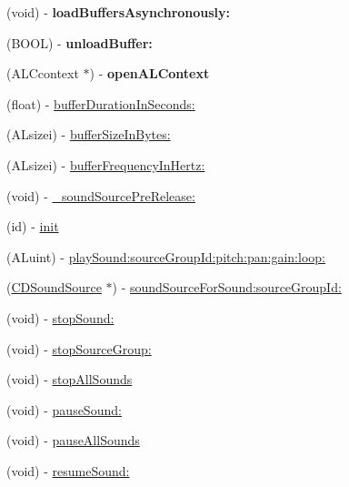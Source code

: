 \begin{DoxyCompactItemize}
(void) -\/ {\bfseries load\+Buffers\+Asynchronously\+:}
\item 
\mbox{\label{interfaceCDSoundEngine_a2a245d09bd9aa88de752c97dd889662e}} 
(B\+O\+OL) -\/ {\bfseries unload\+Buffer\+:}
\item 
\mbox{\label{interfaceCDSoundEngine_a3207754d8ae7d5a63dc03fd43b698d12}} 
(A\+L\+Ccontext $\ast$) -\/ {\bfseries open\+A\+L\+Context}
\item 
(float) -\/ \hyperlink{interfaceCDSoundEngine_a5731f4ec2052eb323ba1777f72c9da8c}{buffer\+Duration\+In\+Seconds\+:}
\item 
(A\+Lsizei) -\/ \hyperlink{interfaceCDSoundEngine_a91672bece24f10760d62cce27986573e}{buffer\+Size\+In\+Bytes\+:}
\item 
(A\+Lsizei) -\/ \hyperlink{interfaceCDSoundEngine_af8559b48f34ad22ba9a7cf27ffcb8648}{buffer\+Frequency\+In\+Hertz\+:}
\item 
(void) -\/ \hyperlink{interfaceCDSoundEngine_ad05b4a121e37fe36d3df453989be82af}{\+\_\+sound\+Source\+Pre\+Release\+:}
\item 
(id) -\/ \hyperlink{interfaceCDSoundEngine_a013cb9b6cf86c0dbfca8fac6aae0bd6a}{init}
\item 
(A\+Luint) -\/ \hyperlink{interfaceCDSoundEngine_a03aee643e250635e2594e5ced4fbe7b2}{play\+Sound\+:source\+Group\+Id\+:pitch\+:pan\+:gain\+:loop\+:}
\item 
(\hyperlink{interfaceCDSoundSource}{C\+D\+Sound\+Source} $\ast$) -\/ \hyperlink{interfaceCDSoundEngine_ab0c372cb85df05a4070b8f8bd2213efd}{sound\+Source\+For\+Sound\+:source\+Group\+Id\+:}
\item 
(void) -\/ \hyperlink{interfaceCDSoundEngine_ae2bbd23eefecd32afcf6bc0109b5e7a2}{stop\+Sound\+:}
\item 
(void) -\/ \hyperlink{interfaceCDSoundEngine_a5d6fbd530895fac2ce486a478e46fb23}{stop\+Source\+Group\+:}
\item 
(void) -\/ \hyperlink{interfaceCDSoundEngine_a8bbc63632a5e72c9235c39730e8efb38}{stop\+All\+Sounds}
\item 
(void) -\/ \hyperlink{interfaceCDSoundEngine_afd1f581938bf541447eaa9430712fff7}{pause\+Sound\+:}
\item 
(void) -\/ \hyperlink{interfaceCDSoundEngine_ac84ad4fe69381aa32b836f8a3a1b5e1f}{pause\+All\+Sounds}
\item 
(void) -\/ \hyperlink{interfaceCDSoundEngine_ad5ce097385bf2a6a347f418bfcbfeb54}{resume\+Sound\+:}

\end{DoxyCompactItemize}
